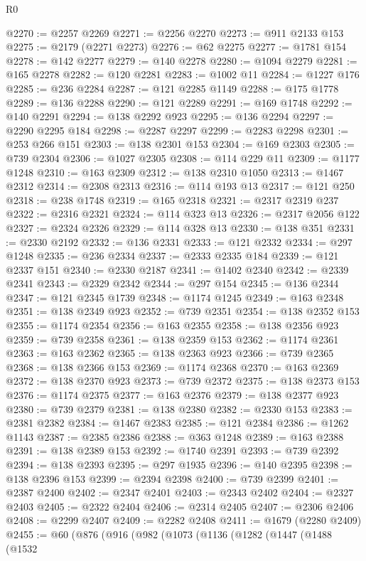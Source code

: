 \begin{lexlean}{R0}
\begin{coremodule}
@2270 := @2257 @2269
@2271 := @2256 @2270
@2273 := @911 @2133 @153
@2275 := @2179 (@2271 @2273)
@2276 := @62 @2275
@2277 := @1781 @154
@2278 := @142 @2277
@2279 := @140 @2278
@2280 := @1094 @2279
@2281 := @165 @2278
@2282 := @120 @2281
@2283 := @1002 @11
@2284 := @1227 @176
@2285 := @236 @2284
@2287 := @121 @2285 @1149
@2288 := @175 @1778
@2289 := @136 @2288
@2290 := @121 @2289
@2291 := @169 @1748
@2292 := @140 @2291
@2294 := @138 @2292 @923
@2295 := @136 @2294
@2297 := @2290 @2295 @184
@2298 := @2287 @2297
@2299 := @2283 @2298
@2301 := @253 @266 @151
@2303 := @138 @2301 @153
@2304 := @169 @2303
@2305 := @739 @2304
@2306 := @1027 @2305
@2308 := @114 @229 @11
@2309 := @1177 @1248
@2310 := @163 @2309
@2312 := @138 @2310 @1050
@2313 := @1467 @2312
@2314 := @2308 @2313
@2316 := @114 @193 @13
@2317 := @121 @250
@2318 := @238 @1748
@2319 := @165 @2318
@2321 := @2317 @2319 @237
@2322 := @2316 @2321
@2324 := @114 @323 @13
@2326 := @2317 @2056 @122
@2327 := @2324 @2326
@2329 := @114 @328 @13
@2330 := @138 @351
@2331 := @2330 @2192
@2332 := @136 @2331
@2333 := @121 @2332
@2334 := @297 @1248
@2335 := @236 @2334
@2337 := @2333 @2335 @184
@2339 := @121 @2337 @151
@2340 := @2330 @2187
@2341 := @1402 @2340
@2342 := @2339 @2341
@2343 := @2329 @2342
@2344 := @297 @154
@2345 := @136 @2344
@2347 := @121 @2345 @1739
@2348 := @1174 @1245
@2349 := @163 @2348
@2351 := @138 @2349 @923
@2352 := @739 @2351
@2354 := @138 @2352 @153
@2355 := @1174 @2354
@2356 := @163 @2355
@2358 := @138 @2356 @923
@2359 := @739 @2358
@2361 := @138 @2359 @153
@2362 := @1174 @2361
@2363 := @163 @2362
@2365 := @138 @2363 @923
@2366 := @739 @2365
@2368 := @138 @2366 @153
@2369 := @1174 @2368
@2370 := @163 @2369
@2372 := @138 @2370 @923
@2373 := @739 @2372
@2375 := @138 @2373 @153
@2376 := @1174 @2375
@2377 := @163 @2376
@2379 := @138 @2377 @923
@2380 := @739 @2379
@2381 := @138 @2380
@2382 := @2330 @153
@2383 := @2381 @2382
@2384 := @1467 @2383
@2385 := @121 @2384
@2386 := @1262 @1143
@2387 := @2385 @2386
@2388 := @363 @1248
@2389 := @163 @2388
@2391 := @138 @2389 @153
@2392 := @1740 @2391
@2393 := @739 @2392
@2394 := @138 @2393
@2395 := @297 @1935
@2396 := @140 @2395
@2398 := @138 @2396 @153
@2399 := @2394 @2398
@2400 := @739 @2399
@2401 := @2387 @2400
@2402 := @2347 @2401
@2403 := @2343 @2402
@2404 := @2327 @2403
@2405 := @2322 @2404
@2406 := @2314 @2405
@2407 := @2306 @2406
@2408 := @2299 @2407
@2409 := @2282 @2408
@2411 := @1679 (@2280 @2409)
@2455 := @60
    (@876
      (@916
        (@982
          (@1073
            (@1136
              (@1282
                (@1447
                  (@1488
                    (@1532

\end{coremodule}
\end{lexlean}
